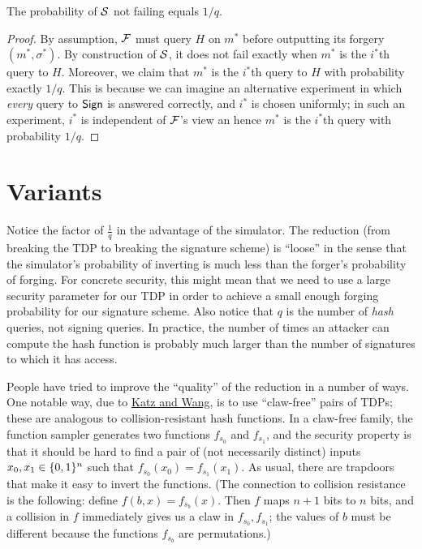 \documentclass[11pt]{article}
\begin{document}
\begin{claim}
  The probability of $\mathcal{S}$ not failing equals $1/q$.
\end{claim}

\begin{proof}
  By assumption, $\mathcal{F}$ must query $H$ on $m^{*}$ before outputting
  its forgery $(m^{*}, \sigma^{*})$.  By construction of $\mathcal{S}$, it
  does not fail exactly when $m^{*}$ is the $i^*$th query to $H$.
  Moreover, we claim that $m^{*}$ is the $i^{*}$th query to $H$ with
  probability exactly $1/q$.  This is because we can imagine an
  alternative experiment in which \emph{every} query to $\mathsf{Sign}$ is
  answered correctly, and $i^{*}$ is chosen uniformly; in such an
  experiment, $i^{*}$ is independent of $\mathcal{F}$'s view an hence $m^{*}$
  is the $i^{*}$th query with probability $1/q$.
\end{proof}
    
\section{Variants}
\label{sec:variants}

Notice the factor of $\frac{1}{q}$ in the advantage of the simulator.
The reduction (from breaking the TDP to breaking the signature scheme)
is ``loose'' in the sense that the simulator's probability of
inverting is much less than the forger's probability of forging.  For
concrete security, this might mean that we need to use a large
security parameter for our TDP in order to achieve a small enough
forging probability for our signature scheme.  Also notice that $q$ is
the number of \emph{hash} queries, not signing queries.  In practice,
the number of times an attacker can compute the hash function is
probably much larger than the number of signatures to which it has
access.

People have tried to improve the ``quality'' of the reduction in a
number of ways.  One notable way, due to
\href{http://www.cs.umd.edu/~jkatz/papers/CCCS03_sigs.pdf}{Katz and
  Wang}, is to use ``claw-free'' pairs of TDPs; these are analogous to
collision-resistant hash functions.  In a claw-free family, the
function sampler generates two functions $f_{s_{0}}$ and $f_{s_{1}}$,
and the security property is that it should be hard to find a pair of
(not necessarily distinct) inputs $x_{0}, x_{1} \in \{0,1\}^{n}$ such
that $f_{s_{0}}(x_{0}) = f_{s_{1}}(x_{1})$.  As usual, there are
trapdoors that make it easy to invert the functions.  (The connection
to collision resistance is the following: define $f(b,x) =
f_{s_{b}}(x)$.  Then $f$ maps $n+1$ bits to $n$ bits, and a collision
in $f$ immediately gives us a claw in $f_{s_{0}}, f_{s_{1}}$; the
values of $b$ must be different because the functions $f_{s_{b}}$ are
permutations.)
\end{document}
